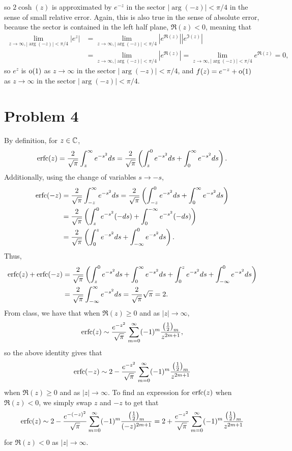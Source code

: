 \documentclass{article}
\begin{document}
so $2\cosh(z)$ is approximated by $e^{-z}$ in the sector $|\arg (-z)|<\pi/4$ in the sense of small relative error. Again, this is also true in the sense of absolute error, because the sector is contained in the left half plane, $\Re(z)<0$, meaning that 
\begin{align*}
\lim_{z\to\infty,|\arg (-z)|<\pi/4}|e^{z}|&=\lim_{z\to\infty,|\arg (-z)|<\pi/4}|e^{\Re(z)}||e^{\Im(z)}|\\&=\lim_{z\to\infty,|\arg (-z)|<\pi/4}|e^{\Re(z)}|=\lim_{z\to\infty,|\arg (-z)|<\pi/4}e^{\Re(z)}=0,
\end{align*}
so $e^{z}$ is $\operatorname{o}(1)$ as $z\to\infty$ in the sector $|\arg (-z)|<\pi/4$, and $f(z)=e^{-z}+\operatorname{o}(1)$ as $z\to\infty$ in the sector $|\arg (-z)|<\pi/4$.

\section{Problem 4}
By definition, for $z\in\mathbb{C}$,
\begin{align*}
\operatorname{erfc}(z)=\frac{2}{\sqrt{\pi}}\int_z^\infty e^{-s^2}ds=\frac{2}{\sqrt{\pi}}\left(\int_z^0 e^{-s^2}ds+\int_0^\infty e^{-s^2}ds\right).
\end{align*}
Additionally, using the change of variables $s\to-s$, 
\begin{align*}
\operatorname{erfc}(-z)&=\frac{2}{\sqrt{\pi}}\int_{-z}^\infty e^{-s^2}ds=\frac{2}{\sqrt{\pi}}\left(\int_{-z}^0 e^{-s^2}ds+\int_0^\infty e^{-s^2}ds\right)\\&=
\frac{2}{\sqrt{\pi}}\left(\int_{z}^0 e^{-s^2}(-ds)+\int_0^{-\infty} e^{-s^2}(-ds)\right)\\&=
\frac{2}{\sqrt{\pi}}\left(\int_{0}^z e^{-s^2}ds+\int_{-\infty}^0 e^{-s^2}ds\right).
\end{align*}
Thus,
\begin{align*}
\operatorname{erfc}(z)+\operatorname{erfc}(-z)&=\frac{2}{\sqrt{\pi}}\left(\int_z^0 e^{-s^2}ds+\int_0^\infty e^{-s^2}ds+\int_{0}^z e^{-s^2}ds+\int_{-\infty}^0 e^{-s^2}ds\right)\\&=
\frac{2}{\sqrt{\pi}}\int_{-\infty}^\infty e^{-s^2}ds=\frac{2}{\sqrt{\pi}}\sqrt{\pi}=2.
\end{align*}
From class, we have that when $\Re(z)\geq0$ and as $|z|\to\infty$, 
\[
\operatorname{erfc}(z)\sim \frac{e^{-z^2}}{\sqrt{\pi}}\sum_{m=0}^\infty(-1)^m\frac{\left(\frac{1}{2}\right)_m}{z^{2m+1}},
\]
so the above identity gives that 
\[
\operatorname{erfc}(-z)\sim 2-\frac{e^{-z^2}}{\sqrt{\pi}}\sum_{m=0}^\infty(-1)^m\frac{\left(\frac{1}{2}\right)_m}{z^{2m+1}}
\]
when $\Re(z)\geq0$ and as $|z|\to\infty$. To find an expression for $\operatorname{erfc}(z)$ when $\Re(z)<0$, we simply swap $z$ and $-z$ to get that 
\[
\operatorname{erfc}(z)\sim 2-\frac{e^{-(-z)^2}}{\sqrt{\pi}}\sum_{m=0}^\infty(-1)^m\frac{\left(\frac{1}{2}\right)_m}{(-z)^{2m+1}}=2+\frac{e^{-z^2}}{\sqrt{\pi}}\sum_{m=0}^\infty(-1)^m\frac{\left(\frac{1}{2}\right)_m}{z^{2m+1}}
\]
for $\Re(z)<0$ as $|z|\to\infty$.
\end{document}
